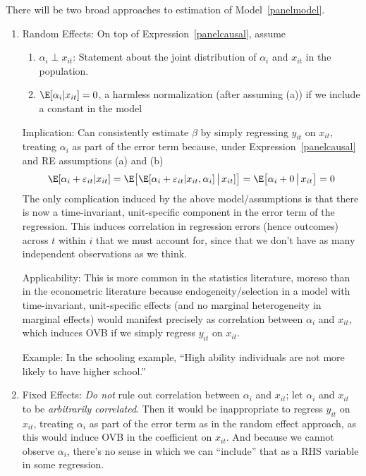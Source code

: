 \documentclass[12pt]{article}
\theoremstyle{plain}
\theoremstyle{definition}
\theoremstyle{remark}
\begin{document}
There will be two broad approaches to estimation of
Model~\ref{panelmodel}.
\begin{enumerate}
  \item Random Effects:
    On top of Expression~\ref{panelcausal}, assume
    \begin{enumerate}[label=(\alph*)]
      \item $\alpha_i\perp x_{it}$: Statement about the joint
        distribution of $\alpha_i$ and $x_{it}$ in the population.

      \item $\E[\alpha_i|x_{it}]=0$, a harmless normalization (after
        assuming (a)) if we include a constant in the model
    \end{enumerate}
    Implication:
    Can consistently estimate $\beta$ by simply regressing $y_{it}$ on
    $x_{it}$, treating $\alpha_i$ as part of the error term because,
    under Expression~\ref{panelcausal} and RE assumptions (a) and (b)
    \begin{align*}
      \E[\alpha_i + \varepsilon_{it}|x_{it}]
      =
      \E\big[\E[\alpha_i + \varepsilon_{it}|x_{it},\alpha_i]\, \big|\,x_{it}]\big]
      =
      \E\big[\alpha_i + 0\,\big|\,x_{it}\big]
      =
      0
    \end{align*}
    The only complication induced by the above model/assumptions is
    that there is now a time-invariant, unit-specific component in
    the error term of the regression.
    This induces correlation in regression errors (hence outcomes)
    across $t$ within $i$ that we must account for, since that we
    don't have as many independent observations as we think.


    Applicability:
    This is more common in the statistics literature, moreso than in the
    econometric literature because endogeneity/selection in a model with
    time-invariant, unit-specific effects (and no marginal heterogeneity
    in marginal effects) would manifest precisely as correlation between
    $\alpha_i$ and $x_{it}$, which induces OVB if we simply regress
    $y_{it}$ on $x_{it}$.

    Example: In the schooling example, ``High ability individuals are
    not more likely to have higher school.''


  \item Fixed Effects:
    \emph{Do not} rule out correlation between $\alpha_i$ and $x_{it}$;
    let $\alpha_i$ and $x_{it}$ to be \emph{arbitrarily correlated}.
    Then it would be inappropriate to regress $y_{it}$ on $x_{it}$,
    treating $\alpha_i$ as part of the error term as in the random
    effect approach, as this would induce OVB in the coefficient on
    $x_{it}$.
    And because we cannot observe $\alpha_i$, there's no sense in which
    we can ``include'' that as a RHS variable in some regression.


\end{enumerate}
\end{document}
